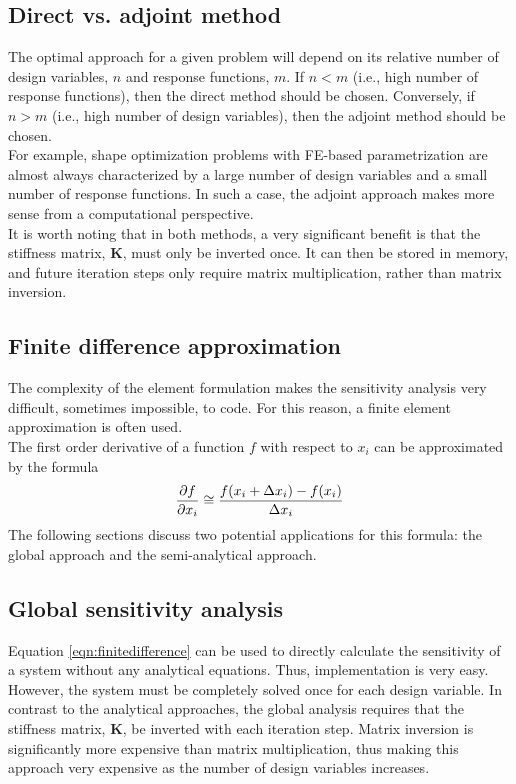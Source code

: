 \subsection{Direct vs. adjoint method}
The optimal approach for a given problem will depend on its relative number of design variables, $n$ and response functions, $m$. If $n<m$ (i.e., high number of response functions), then the direct method should be chosen. Conversely, if $n>m$ (i.e., high number of design variables), then the adjoint method should be chosen.\\[3pt]
For example, shape optimization problems with FE-based parametrization are almost always characterized by a large number of design variables and a small number of response functions.\cite{firl_dissertation} In such a case, the adjoint approach makes more sense from a computational perspective.\\[3pt]
It is worth noting that in both methods, a very significant benefit is that the stiffness matrix, $\textbf{K}$, must only be inverted once. It can then be stored in memory, and future iteration steps only require matrix multiplication, rather than matrix inversion.

\subsection{Finite difference approximation}
The complexity of the element formulation makes the sensitivity analysis very difficult, sometimes impossible, to code. For this reason, a finite element approximation is often used. \\[3pt]
The first order derivative of a function $f$ with respect to $x_i$ can be approximated by the formula 
\begin{equation} \label{eqn:finitedifference}
\pdv{f}{x_i} \cong \frac{f(x_i + \Delta x_i) - f(x_i)}{\Delta x_i}
\end{equation}
The following sections discuss two potential applications for this formula: the global approach and the semi-analytical approach.
\subsection{Global sensitivity analysis}
Equation \ref{eqn:finitedifference} can be used to directly calculate the sensitivity of a system without any analytical equations. Thus, implementation is very easy. However, the system must be completely solved once for each design variable. In contrast to the analytical approaches, the global analysis requires that the stiffness matrix, $\textbf{K}$, be inverted with each iteration step. Matrix inversion is significantly more expensive than matrix multiplication, thus making this approach very expensive as the number of design variables increases.

